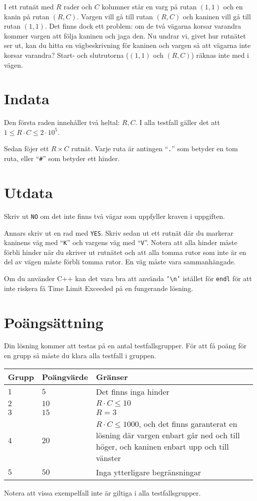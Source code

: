 I ett rutnät med $R$ rader och $C$ kolumner står en varg på rutan $(1, 1)$ och en kanin på rutan $(R, C)$.
Vargen vill gå till rutan $(R, C)$ och kaninen vill gå till rutan $(1, 1)$.
Det finns dock ett problem: om de två vägarna korsar varandra kommer vargen att följa kaninen och jaga den.
Nu undrar vi, givet hur rutnätet ser ut, kan du hitta en vägbeskrivning för kaninen och vargen så att vägarna inte korsar varandra?
Start- och slutrutorna ($(1, 1)$ och $(R, C)$) räknas inte med i vägen.

\section*{Indata}
Den första raden innehåller två heltal: $R, C$. I alla testfall gäller det att $1 \leq R \cdot C \leq 2 \cdot 10^5$.

Sedan föjer ett $R \times C$ rutnät. Varje ruta är antingen ``\texttt{.}'' som betyder en tom ruta, eller ``\texttt{\#}'' som betyder ett hinder.

\section*{Utdata}
Skriv ut \texttt{NO} om det inte finns två vägar som uppfyller kraven i uppgiften.

Annars skriv ut en rad med \texttt{YES}.
Skriv sedan ut ett rutnät där du markerar kaninens väg med ``\texttt{K}'' och vargens väg med ``\texttt{V}''.
Notera att alla hinder måste förbli hinder när du skriver ut rutnätet och att alla tomma rutor som inte är en del av vägen måste förbli tomma rutor.
En väg måste vara sammanhängade.

Om du använder C++ kan det vara bra att använda \texttt{'\textbackslash{}n'} istället för \texttt{endl} för att inte riskera få Time Limit Exceeded på en fungerande lösning.

\section*{Poängsättning}
Din lösning kommer att testas på en antal testfallsgrupper.
För att få poäng för en grupp så måste du klara alla testfall i gruppen.

\noindent
\begin{tabular}{| l | l | p{12cm} |}
  \hline
  Grupp & Poängvärde & Gränser \\ \hline
  $1$   & $5$        & Det finns inga hinder\\ \hline
  $2$   & $10$       & $R \cdot C \leq 10$  \\ \hline
  $3$   & $15$       & $R = 3$  \\ \hline
  $4$   & $20$       & $R \cdot C \leq 1000$, och det finns garanterat en lösning där vargen enbart går ned och till höger, och kaninen enbart upp och till vänster  \\ \hline
  $5$   & $50$       & Inga ytterligare begränsningar  \\ \hline
\end{tabular}

Notera att vissa exempelfall inte är giltiga i alla testfallsgrupper.
